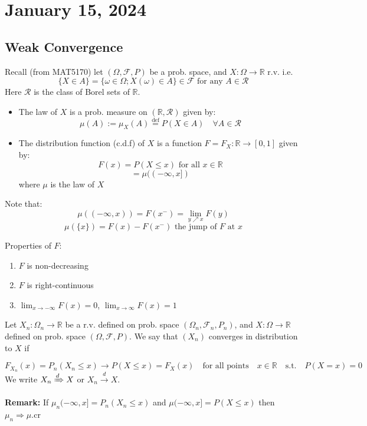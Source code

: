 \section{January 15, 2024}
\subsection{Weak Convergence}
Recall (from MAT5170) let $(\Omega, \mathcal{F}, P)$ be a prob. space, and $X : \Omega \rightarrow \mathbb{R}$ r.v. i.e. 
\[\{X \in A\} = \{ \omega \in \Omega; X(\omega) \in A \} \in \mathcal{F} \text{ for any } A \in \mathcal{R}\]
Here $\mathcal{R}$ is the class of Borel sets of $\mathbb{R}$.

\begin{itemize}
  \item The law of $X$ is a prob. measure on $(\mathbb{R}, \mathcal{R})$ given by:
  \[\mu(A):= \mu_X(A) \stackrel{\text{def}}{=} P(X \in A) \quad \forall A \in \mathcal{R}\]

  \item The distribution function (c.d.f) of $X$ is a function $F=F_X : \mathbb{R} \rightarrow [0,1]$ given by:
  \[F(x) = P(X \leq x) \text{ for all } x \in \mathbb{R}\]
  \[= \mu((-\infty, x])\]
  where $\mu$ is the law of $X$
\end{itemize}

Note that:
\[\mu((-\infty, x)) = F(x^-) = \lim_{y \nearrow x} F(y)\]
\[\mu(\{x\}) = F(x) - F(x^-) \text{ the jump of } F \text{ at } x\]

Properties of $F$:
\begin{enumerate}
  \item $F$ is non-decreasing
  \item $F$ is right-continuous
  \item $\lim_{x \to -\infty} F(x) = 0$, $\lim_{x \to \infty} F(x) = 1$
\end{enumerate}

\begin{definition}
    Let \( X_n: \Omega_n \rightarrow \mathbb{R} \) be a r.v. defined on prob. space \( (\Omega_n, \mathcal{F}_n, P_n) \), and \( X: \Omega \rightarrow \mathbb{R} \) defined on prob. space \( (\Omega, \mathcal{F}, P) \). We say that \( (X_n) \) converges in distribution to \( X \) if

\[
F_{X_n}(x) = P_n(X_n \leq x) \rightarrow P(X \leq x) = F_X(x) \quad \text{for all points} \quad x \in \mathbb{R} \quad \text{s.t.} \quad P(X = x) = 0
\]
We write \( X_n \xRightarrow{d} X \) or \( X_n \xrightarrow{d} X \).
\end{definition}

\textbf{Remark:} If \( \mu_n(-\infty, x] = P_n(X_n \leq x) \) and \( \mu(-\infty, x] = P(X \leq x) \) then \( \mu_n \Rightarrow \mu \).cr